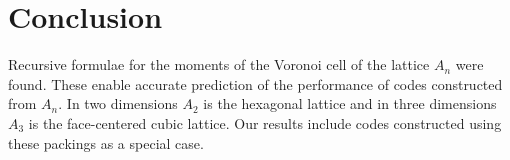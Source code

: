 \documentclass[journal]{IEEEtran}
\begin{document}



\section{Conclusion}

Recursive formulae for the moments of the Voronoi cell of the lattice $A_n$ were found.  These enable accurate prediction of the performance of codes constructed from $A_n$.  In two dimensions $A_2$ is the hexagonal lattice and in three dimensions $A_3$ is the face-centered cubic lattice.  Our results include codes constructed using these packings as a special case.  %




\small



\end{document}
